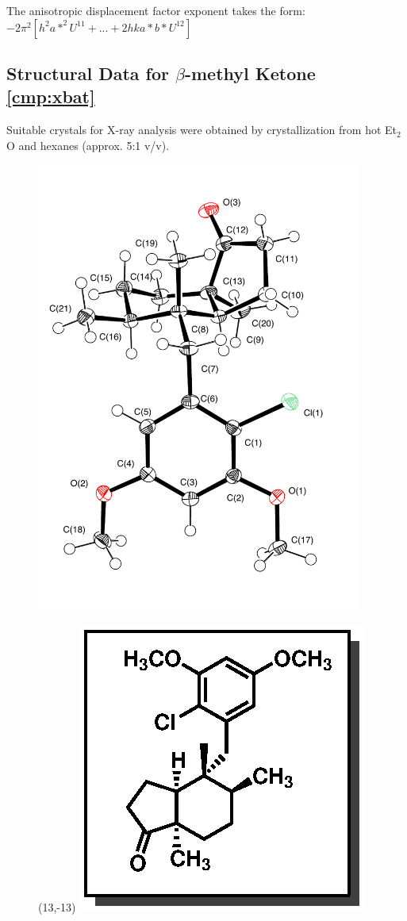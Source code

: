 { \footnotesize
The anisotropic displacement factor exponent takes the form: 
$-2\pi^2\left[ h^2a*^2U^{11} + ... + 2 h k a* b* U^{12} \right]$ }

\pagebreak



\subsection{Structural Data for $\beta$-methyl Ketone \ref{cmp:xbat}}
Suitable crystals for X-ray analysis were obtained by
crystallization from hot Et$_2$O and hexanes (approx. 5:1 v/v).
\begin{figure}[h]
  \includegraphics[width=4.2in]{chp_singlecarbon/images/xray/xbat_labelled}
    \begin{textblock}{1}(13,-13)
\includegraphics[scale=0.8]{chp_singlecarbon/images/xbat}

\end{textblock}
\end{figure}
